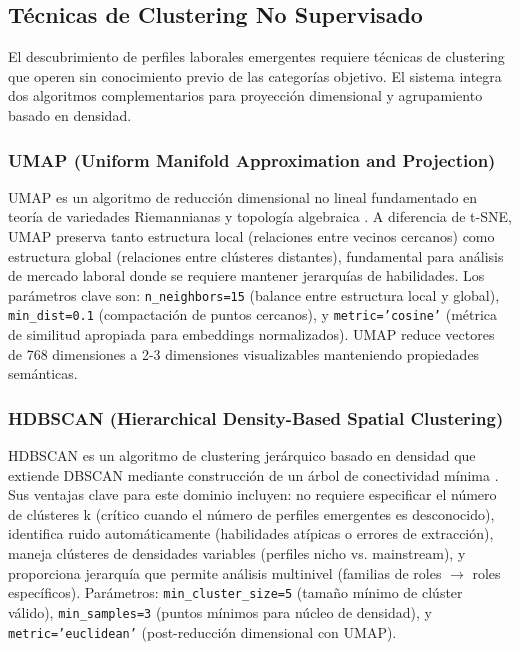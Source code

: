 \subsection{Técnicas de Clustering No Supervisado}

El descubrimiento de perfiles laborales emergentes requiere técnicas de clustering que operen sin conocimiento previo de las categorías objetivo. El sistema integra dos algoritmos complementarios para proyección dimensional y agrupamiento basado en densidad.

\subsubsection{UMAP (Uniform Manifold Approximation and Projection)}

UMAP es un algoritmo de reducción dimensional no lineal fundamentado en teoría de variedades Riemannianas y topología algebraica \cite{mcinnes2018umap}. A diferencia de t-SNE, UMAP preserva tanto estructura local (relaciones entre vecinos cercanos) como estructura global (relaciones entre clústeres distantes), fundamental para análisis de mercado laboral donde se requiere mantener jerarquías de habilidades. Los parámetros clave son: \texttt{n\_neighbors=15} (balance entre estructura local y global), \texttt{min\_dist=0.1} (compactación de puntos cercanos), y \texttt{metric='cosine'} (métrica de similitud apropiada para embeddings normalizados). UMAP reduce vectores de 768 dimensiones a 2-3 dimensiones visualizables manteniendo propiedades semánticas.

\subsubsection{HDBSCAN (Hierarchical Density-Based Spatial Clustering)}

HDBSCAN es un algoritmo de clustering jerárquico basado en densidad que extiende DBSCAN mediante construcción de un árbol de conectividad mínima \cite{campello2013}. Sus ventajas clave para este dominio incluyen: no requiere especificar el número de clústeres k (crítico cuando el número de perfiles emergentes es desconocido), identifica ruido automáticamente (habilidades atípicas o errores de extracción), maneja clústeres de densidades variables (perfiles nicho vs. mainstream), y proporciona jerarquía que permite análisis multinivel (familias de roles $\rightarrow$ roles específicos). Parámetros: \texttt{min\_cluster\_size=5} (tamaño mínimo de clúster válido), \texttt{min\_samples=3} (puntos mínimos para núcleo de densidad), y \texttt{metric='euclidean'} (post-reducción dimensional con UMAP).

